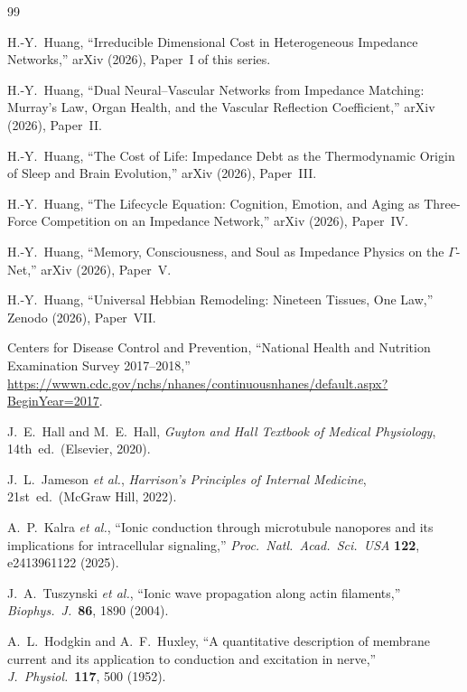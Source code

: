 \documentclass[aps,pre,twocolumn,superscriptaddress,floatfix]{revtex4-2}
\begin{document}
\begin{thebibliography}{99}

H.-Y.~Huang, ``Irreducible Dimensional Cost in Heterogeneous
Impedance Networks,'' arXiv (2026), Paper~I of this series.

H.-Y.~Huang, ``Dual Neural--Vascular Networks from Impedance
Matching: Murray's Law, Organ Health, and the Vascular
Reflection Coefficient,'' arXiv (2026), Paper~II.

H.-Y.~Huang, ``The Cost of Life: Impedance Debt as the
Thermodynamic Origin of Sleep and Brain Evolution,''
arXiv (2026), Paper~III.

H.-Y.~Huang, ``The Lifecycle Equation: Cognition, Emotion,
and Aging as Three-Force Competition on an Impedance Network,''
arXiv (2026), Paper~IV.

H.-Y.~Huang, ``Memory, Consciousness, and Soul as Impedance
Physics on the $\Gamma$-Net,'' arXiv (2026), Paper~V.

H.-Y.~Huang, ``Universal Hebbian Remodeling: Nineteen
Tissues, One Law,'' Zenodo (2026), Paper~VII.

Centers for Disease Control and Prevention,
``National Health and Nutrition Examination Survey 2017--2018,''
\url{https://wwwn.cdc.gov/nchs/nhanes/continuousnhanes/default.aspx?BeginYear=2017}.

J.~E.~Hall and M.~E.~Hall, \emph{Guyton and Hall Textbook of
Medical Physiology}, 14th~ed.\ (Elsevier, 2020).

J.~L.~Jameson \emph{et al.}, \emph{Harrison's Principles of
Internal Medicine}, 21st~ed.\ (McGraw Hill, 2022).

A.~P.~Kalra \emph{et al.}, ``Ionic conduction through
microtubule nanopores and its implications for intracellular
signaling,'' \emph{Proc.\ Natl.\ Acad.\ Sci.\ USA}
\textbf{122}, e2413961122 (2025).

J.~A.~Tuszynski \emph{et al.}, ``Ionic wave propagation along
actin filaments,'' \emph{Biophys.\ J.}\ \textbf{86}, 1890
(2004).

A.~L.~Hodgkin and A.~F.~Huxley, ``A quantitative description
of membrane current and its application to conduction and
excitation in nerve,'' \emph{J.\ Physiol.}\ \textbf{117}, 500
(1952).


\end{thebibliography}
\end{document}
